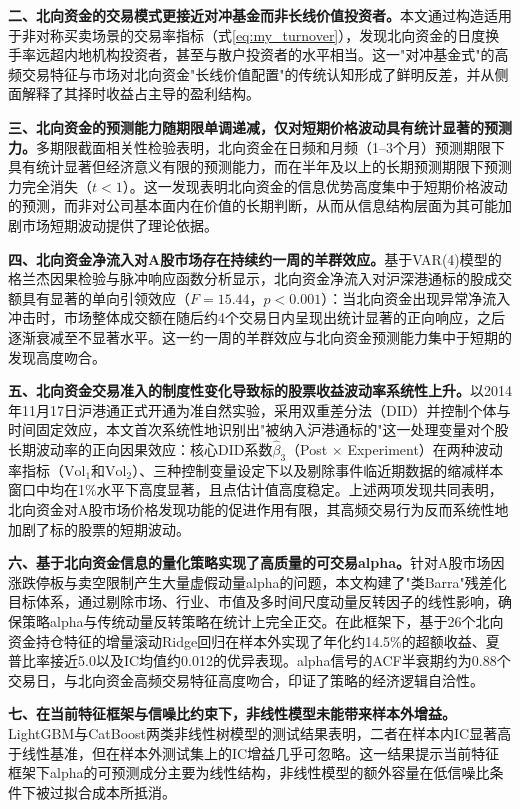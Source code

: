 \documentclass{article}
\begin{document}
\textbf{二、北向资金的交易模式更接近对冲基金而非长线价值投资者。}本文通过构造适用于非对称买卖场景的交易率指标（式\ref{eq:my_turnover}），发现北向资金的日度换手率远超内地机构投资者，甚至与散户投资者的水平相当。这一"对冲基金式"的高频交易特征与市场对北向资金"长线价值配置"的传统认知形成了鲜明反差，并从侧面解释了其择时收益占主导的盈利结构。

\textbf{三、北向资金的预测能力随期限单调递减，仅对短期价格波动具有统计显著的预测力。}多期限截面相关性检验表明，北向资金在日频和月频（1--3个月）预测期限下具有统计显著但经济意义有限的预测能力，而在半年及以上的长期预测期限下预测力完全消失（$t < 1$）。这一发现表明北向资金的信息优势高度集中于短期价格波动的预测，而非对公司基本面内在价值的长期判断，从而从信息结构层面为其可能加剧市场短期波动提供了理论依据。

\textbf{四、北向资金净流入对A股市场存在持续约一周的羊群效应。}基于VAR(4)模型的格兰杰因果检验与脉冲响应函数分析显示，北向资金净流入对沪深港通标的股成交额具有显著的单向引领效应（$F = 15.44$，$p < 0.001$）：当北向资金出现异常净流入冲击时，市场整体成交额在随后约4个交易日内呈现出统计显著的正向响应，之后逐渐衰减至不显著水平。这一约一周的羊群效应与北向资金预测能力集中于短期的发现高度吻合。

\textbf{五、北向资金交易准入的制度性变化导致标的股票收益波动率系统性上升。}以2014年11月17日沪港通正式开通为准自然实验，采用双重差分法（DID）并控制个体与时间固定效应，本文首次系统性地识别出"被纳入沪港通标的"这一处理变量对个股长期波动率的正向因果效应：核心DID系数$\hat{\beta}_3$（Post $\times$ Experiment）在两种波动率指标（$\text{Vol}_1$和$\text{Vol}_2$）、三种控制变量设定下以及剔除事件临近期数据的缩减样本窗口中均在1\%水平下高度显著，且点估计值高度稳定。上述两项发现共同表明，北向资金对A股市场价格发现功能的促进作用有限，其高频交易行为反而系统性地加剧了标的股票的短期波动。

\textbf{六、基于北向资金信息的量化策略实现了高质量的可交易alpha。}针对A股市场因涨跌停板与卖空限制产生大量虚假动量alpha的问题，本文构建了"类Barra"残差化目标体系，通过剔除市场、行业、市值及多时间尺度动量反转因子的线性影响，确保策略alpha与传统动量反转策略在统计上完全正交。在此框架下，基于26个北向资金持仓特征的增量滚动Ridge回归在样本外实现了年化约14.5\%的超额收益、夏普比率接近5.0以及IC均值约0.012的优异表现。alpha信号的ACF半衰期约为0.88个交易日，与北向资金高频交易特征高度吻合，印证了策略的经济逻辑自洽性。

\textbf{七、在当前特征框架与信噪比约束下，非线性模型未能带来样本外增益。}LightGBM与CatBoost两类非线性树模型的测试结果表明，二者在样本内IC显著高于线性基准，但在样本外测试集上的IC增益几乎可忽略。这一结果提示当前特征框架下alpha的可预测成分主要为线性结构，非线性模型的额外容量在低信噪比条件下被过拟合成本所抵消。
\end{document}
